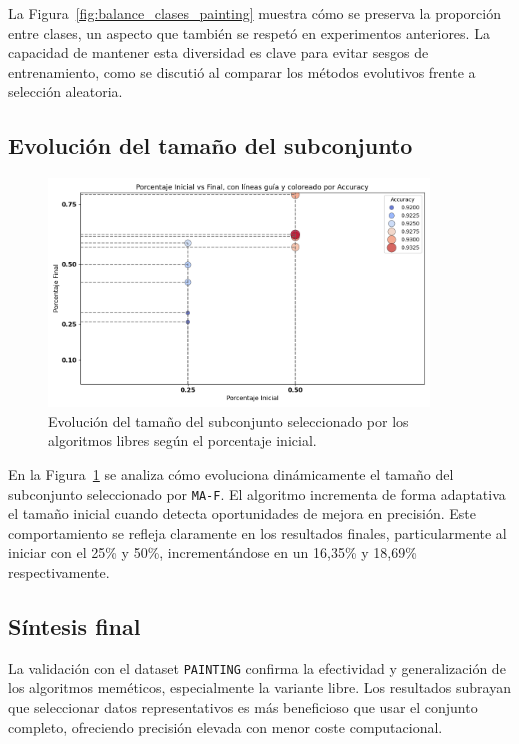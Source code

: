 La Figura~\ref{fig:balance_clases_painting} muestra cómo se preserva la proporción entre clases,
un aspecto que también se respetó en experimentos anteriores.
La capacidad de mantener esta diversidad es clave para evitar sesgos de entrenamiento,
como se discutió al comparar los métodos evolutivos frente a selección aleatoria.

\subsection{Evolución del tamaño del subconjunto}

\begin{figure}[htp]
    \centering
    \includegraphics[width=0.9\textwidth]{imagenes/evaluaciones/painting/scatter-por-porcentaje.png}
    \caption{Evolución del tamaño del subconjunto seleccionado por los algoritmos libres según el porcentaje inicial.}
    \label{fig:evolucion_porcentaje_libre}
\end{figure}

En la Figura~\ref{fig:evolucion_porcentaje_libre} se analiza cómo evoluciona dinámicamente el tamaño del subconjunto seleccionado por \texttt{MA-F}.
El algoritmo incrementa de forma adaptativa el tamaño inicial cuando detecta oportunidades de mejora en precisión.
Este comportamiento se refleja claramente en los resultados finales, particularmente al iniciar con el 25\% y 50\%, incrementándose en un 16,35\% y 18,69\% respectivamente.

\subsection{Síntesis final}
La validación con el dataset \texttt{PAINTING} confirma la efectividad y generalización de los algoritmos meméticos, especialmente la variante libre.
Los resultados subrayan que seleccionar datos representativos es más beneficioso que usar el conjunto completo, ofreciendo precisión elevada con menor coste computacional.

